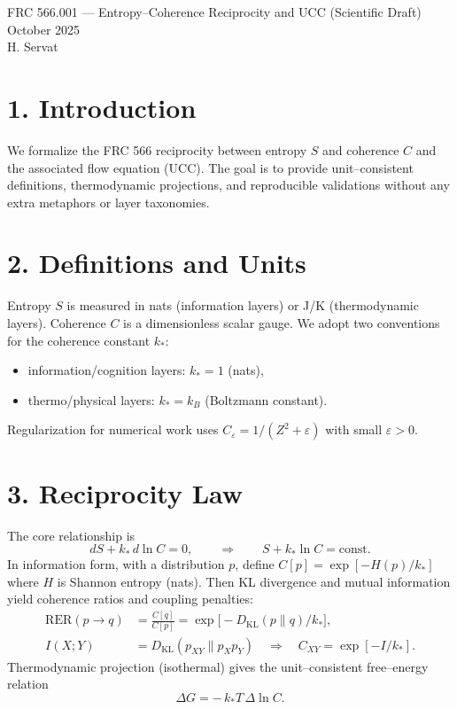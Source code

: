 \documentclass[10pt]{article}
\begin{document}
\begin{center}
{\Large FRC 566.001 — Entropy–Coherence Reciprocity and UCC (Scientific Draft)}\\
{\large October 2025}\\[4pt]
H. Servat
\end{center}

\section*{1. Introduction}
We formalize the FRC 566 reciprocity between entropy $S$ and coherence $C$ and the associated flow equation (UCC). The goal is to provide unit–consistent definitions, thermodynamic projections, and reproducible validations without any extra metaphors or layer taxonomies.

\section*{2. Definitions and Units}
Entropy $S$ is measured in nats (information layers) or J/K (thermodynamic layers). Coherence $C$ is a dimensionless scalar gauge. We adopt two conventions for the coherence constant $k_*$:
\begin{itemize}
  \item information/cognition layers: $k_*=1$ (nats),
  \item thermo/physical layers: $k_*=k_B$ (Boltzmann constant).
\end{itemize}
Regularization for numerical work uses $C_\varepsilon = 1/(Z^2+\varepsilon)$ with small $\varepsilon>0$.

\section*{3. Reciprocity Law}
The core relationship is
\begin{equation}
 dS + k_*\, d\ln C = 0, \qquad \Rightarrow \qquad S + k_*\ln C = \text{const.}
\end{equation}
In information form, with a distribution $p$, define $C[p]=\exp[-H(p)/k_*]$ where $H$ is Shannon entropy (nats). Then KL divergence and mutual information yield coherence ratios and coupling penalties:
\begin{align}
\mathrm{RER}(p\!\to\!q) &= \frac{C[q]}{C[p]} = \exp\!\big[ -D_{\mathrm{KL}}(p\|q)/k_* \big],\\
I(X;Y) &= D_{\mathrm{KL}}(p_{XY}\|p_Xp_Y) \quad \Rightarrow \quad C_{XY}=\exp[-I/k_*].
\end{align}
Thermodynamic projection (isothermal) gives the unit–consistent free–energy relation
\begin{equation}
 \Delta G = -\,k_* T\, \Delta \ln C.
\end{equation}
\end{document}

